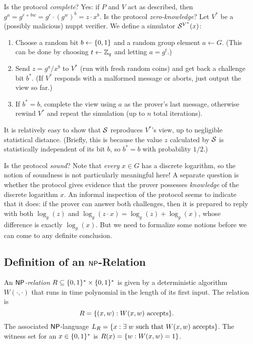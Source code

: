 \documentclass[11pt]{article}
\begin{document}
Is the protocol \emph{complete}?  Yes: if $P$ and $V$ act as
described, then $g^{a} = g^{r + bw} = g^{r} \cdot (g^{w})^{b} = z
\cdot x^{b}$.  Is the protocol \emph{zero-knowledge}?  Let $V^{*}$ be
a (possibly malicious) nuppt verifier.  We define a simulator
$\mathcal{S}^{V^{*}}(x)$:
\begin{enumerate}

\item Choose a random bit $b \gets \{0,1\}$ and a random group element $a
  \gets G$.  (This can be done by choosing $t \gets \mathbb{Z}_q$ and letting
  $a = g^{t}$.)

\item Send $z = g^{a} / x^{b}$ to $V^{*}$ (run with fresh random
  coins) and get back a challenge bit $b^{*}$.  (If $V^{*}$ responds
  with a malformed message or aborts, just output the view so far.)

\item If $b^{*} = b$, complete the view using $a$ as the prover's last
  message, otherwise rewind $V^{*}$ and repeat the simulation (up to
  $n$ total iterations).
\end{enumerate}
It is relatively easy to show that $\mathcal{S}$ reproduces $V^{*}$'s view,
up to negligible statistical distance.  (Briefly, this is because the
value $z$ calculated by $\mathcal{S}$ is statistically independent of its bit
$b$, so $b^{*} = b$ with probability $1/2$.)

Is the protocol \emph{sound}?  Note that \emph{every} $x \in G$ has a
discrete logarithm, so the notion of soundness is not particularly
meaningful here!  A separate question is whether the protocol gives
evidence that the prover possesses \emph{knowledge} of the discrete
logarithm $x$.  An informal inspection of the protocol seems to
indicate that it does: if the prover can answer both challenges, then
it is prepared to reply with both $\log_{g}(z)$ and $\log_{g}(z \cdot
x) = \log_{g}(z) + \log_{g}(x)$, whose difference is exactly
$\log_{g}(x)$.  But we need to formalize some notions before we can
come to any definite conclusion.

\subsection{Definition of an $\mathsf{NP}$-Relation}
\label{sec:def-pok}

\begin{definition}
  \label{def:NP-relation}
  An \emph{$\mathsf{NP}$-relation} $R \subseteq \{0,1\}^{*} \times \{0,1\}^{*}$ is
  given by a deterministic algorithm $W(\cdot,\cdot)$ that runs in
  time polynomial in the length of its first input.  The relation
  is \[ R = \{(x,w) : W(x,w) \text{ accepts}\}. \] The associated
  $\mathsf{NP}$-language $L_{R} = \{x : \exists\; w \text{ such that }
    W(x,w) \text{ accepts}\}$.  The witness set for an $x \in \{0,1\}^{*}$
  is $R(x) = \{w : W(x,w) = 1\}$.
\end{definition}
\end{document}
